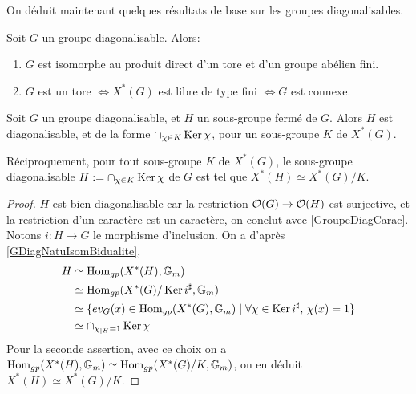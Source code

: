 \noindent On déduit maintenant quelques résultats de base sur les groupes diagonalisables.

\begin{prop}
Soit $G$ un groupe diagonalisable. Alors:
\begin{enumerate}
\item $G$ est isomorphe au produit direct d'un tore et d'un groupe abélien fini.
\item $G$ est un tore $\iff X^*(G)$ est libre de type fini $\iff G$ est connexe.
\end{enumerate}
\end{prop}

\begin{prop}
Soit $G$ un groupe diagonalisable, et $H$ un sous-groupe fermé de $G$. Alors $H$ est diagonalisable, et de la forme $\cap_{\chi\in K}\operatorname{Ker}\chi$, pour un sous-groupe $K$ de $X^*(G)$. 

Réciproquement, pour tout sous-groupe $K$ de $X^*(G)$, le sous-groupe diagonalisable $H:=\cap_{\chi\in K}\operatorname{Ker}\chi$ de $G$ est tel que $X^*(H)\simeq X^*(G)/K$.
\end{prop}
\begin{proof}
$H$ est bien diagonalisable car la restriction $\mathcal{O}(G)\rightarrow \mathcal{O}(H)$ est surjective, et la restriction d'un caractère est un caractère, on conclut avec \ref{GroupeDiagCarac}. Notons $i:H\rightarrow G$ le morphisme d'inclusion. On a d'après \ref{GDiagNatuIsomBidualite}, 
\begin{equation}
\begin{split}
H & \simeq\operatorname{Hom}_{gp}(X^*(H),\mathbb{G}_m) \\
    & \simeq\operatorname{Hom}_{gp}(X^*(G)/\operatorname{Ker} i^\sharp,\mathbb{G}_m)\\
    &\simeq\lbrace ev_G(x)\in\operatorname{Hom}_{gp}(X^*(G),\mathbb{G}_m)\mid\forall \chi\in\operatorname{Ker} i^\sharp,\,\chi(x)=1\rbrace\\
    &\simeq\cap_{\chi_{|H}=1}\operatorname{Ker} \chi
\end{split}
\end{equation}
Pour la seconde assertion, avec ce choix on a  $\operatorname{Hom}_{gp}(X^*(H),\mathbb{G}_m)\simeq\operatorname{Hom}_{gp}(X^*(G)/K,\mathbb{G}_m)$, on en déduit $X^*(H)\simeq X^*(G)/K$.
\end{proof}

